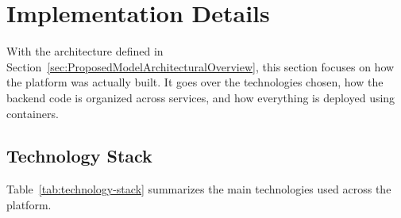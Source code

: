 
\section{Implementation Details}
\label{sec:ProposedModelImplementationDetails}

With the architecture defined in Section~\ref{sec:ProposedModelArchitecturalOverview}, this section focuses on how the platform was actually built. It goes over the technologies chosen, how the backend code is organized across services, and how everything is deployed using containers.

\subsection{Technology Stack}
Table~\ref{tab:technology-stack} summarizes the main technologies used across the platform.

